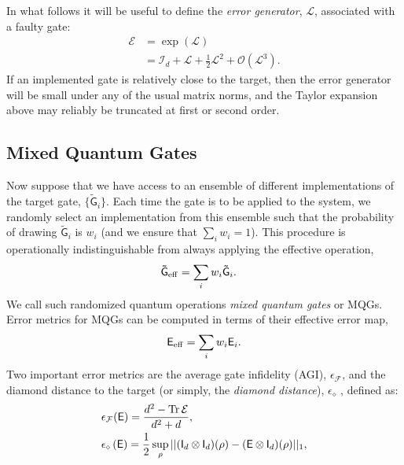 \documentclass[aps,nofootinbib,pra,notitlepage,twocolumn]{revtex4-1}
\newcommand{\tr}{{\rm Tr\thinspace}}
\newcommand{\order}[1]{\mathcal{O}\left( #1 \right)}
\begin{document}
In what follows it will be useful to define the \emph{error generator}, $\mathcal{L}$, associated with a faulty gate: 
\begin{align}
	\label{eq:generator}
	\mathcal{E} 
		&= \exp\left(\mathcal{L}\right) \\
		&= \mathcal{I}_d + \mathcal{L} + \frac{1}{2}\mathcal{L}^2 + \order{\mathcal{L}^3}.
\end{align}
If an implemented gate is relatively close to the target, then the error generator will be small under any of the usual matrix norms, and the Taylor expansion above may reliably be truncated at first or second order. 


\subsection{Mixed Quantum Gates}
\noindent Now suppose that we have access to an ensemble of different implementations of the target gate, $\{\mathsf{\tilde G}_i\}$.
Each time the gate is to be applied to the system, we randomly select an implementation from this ensemble such that the probability of drawing $\mathsf{\tilde{G}}_i$ is $w_i$ (and we ensure that $\sum_i w_i=1$). This procedure is operationally indistinguishable from always applying the effective operation, 
\begin{align}
	\mathsf{\tilde G}_{\rm eff} &= \sum_i w_i \mathsf{\tilde G}_i.
\end{align}
We call such randomized quantum operations \emph{mixed quantum gates} or MQGs. Error metrics for MQGs can be computed in terms of their effective error map, 
\begin{equation}
	\label{eq:effective_error}
	\mathsf{E}_{\rm eff} = \sum_i w_i \mathsf{E}_i.
\end{equation}
Two important error metrics are the average gate infidelity (AGI), $\epsilon_\mathcal{F}$, and the diamond distance to the target (or simply, the \emph{diamond distance}), $\epsilon_\diamond$ \cite{watrous2018theory}, defined as:
\begin{align}
	\label{eq:def_agi}
	&\epsilon_\mathcal{F}(\mathsf{E}) = \frac{d^2 - \tr{\mathcal{E}}}{d^2 + d},\\
	\label{eq:def_diamond}
	&\epsilon_\diamond \left(\mathsf{E}\right)
		= \frac{1}{2} \sup_\rho \vert \vert (\mathsf{I}_d\otimes \mathsf{I}_d)(\rho) 
										  - (\mathsf{E} \otimes \mathsf{I}_d)(\rho) \vert\vert_1,
\end{align}
\end{document}
